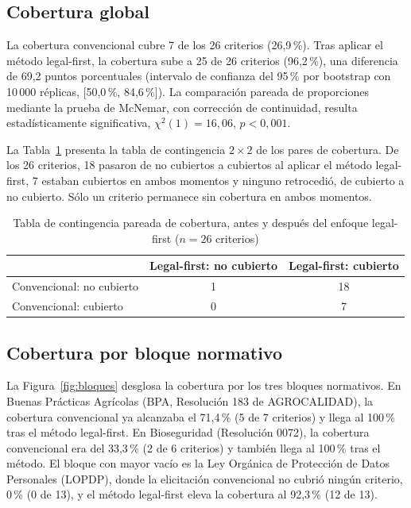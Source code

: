 \documentclass[pdflatex,sn-mathphys-num]{sn-jnl}
\begin{document}
\subsection{Cobertura global}

La cobertura convencional cubre 7 de los 26 criterios (26,9\,\%). Tras aplicar el m\'etodo legal-first, la cobertura sube a 25 de 26 criterios (96,2\,\%), una diferencia de 69,2 puntos porcentuales (intervalo de confianza del 95\,\% por bootstrap con 10\,000 r\'eplicas, [50,0\,\%, 84,6\,\%]). La comparaci\'on pareada de proporciones mediante la prueba de McNemar, con correcci\'on de continuidad, resulta estad\'isticamente significativa, $\chi^2(1)=16,06$, $p<0,001$.

La Tabla~\ref{tab:mcnemar} presenta la tabla de contingencia $2\times2$ de los pares de cobertura. De los 26 criterios, 18 pasaron de no cubiertos a cubiertos al aplicar el m\'etodo legal-first, 7 estaban cubiertos en ambos momentos y ninguno retrocedi\'o, de cubierto a no cubierto. S\'olo un criterio permanece sin cobertura en ambos momentos.

\begin{table}[htbp]
\caption{Tabla de contingencia pareada de cobertura, antes y despu\'es del enfoque legal-first ($n=26$ criterios)}\label{tab:mcnemar}
\begin{tabular}{@{}lcc@{}}
\toprule
 & Legal-first: no cubierto & Legal-first: cubierto \\
\midrule
Convencional: no cubierto & 1 & 18 \\
Convencional: cubierto & 0 & 7 \\
\bottomrule
\end{tabular}
\end{table}

\subsection{Cobertura por bloque normativo}

La Figura~\ref{fig:bloques} desglosa la cobertura por los tres bloques normativos. En Buenas Pr\'acticas Agr\'icolas (BPA, Resoluci\'on 183 de AGROCALIDAD), la cobertura convencional ya alcanzaba el 71,4\,\% (5 de 7 criterios) y llega al 100\,\% tras el m\'etodo legal-first. En Bioseguridad (Resoluci\'on 0072), la cobertura convencional era del 33,3\,\% (2 de 6 criterios) y tambi\'en llega al 100\,\% tras el m\'etodo. El bloque con mayor vac\'io es la Ley Org\'anica de Protecci\'on de Datos Personales (LOPDP), donde la elicitaci\'on convencional no cubri\'o ning\'un criterio, 0\,\% (0 de 13), y el m\'etodo legal-first eleva la cobertura al 92,3\,\% (12 de 13).
\end{document}
